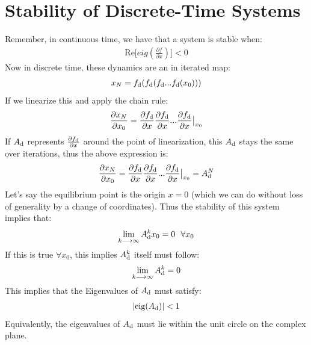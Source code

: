\section{Stability of Discrete-Time Systems}
Remember, in continuous time, we have that a system is stable when: 
\begin{align}
    \textrm{Re} \big[ eig ( \frac{\partial f}{\partial x} ) \big] < 0 
\end{align}
Now in discrete time, these dynamics are an in iterated map: 
\begin{align}
    x_{N} = f_{\rm d} ( f_{\rm d} ( f_{\rm d} ... f_{\rm d} (x_0)))
\end{align}
If we linearize this and apply the chain rule: 
\begin{align}
    \frac{\partial x_N}{\partial x_0} = \frac{\partial f_{\rm d}}{\partial x} \frac{\partial f_{\rm d}}{\partial x} ... \evalat{\frac{\partial f_{\rm d}}{\partial x}}{x_0}
\end{align}
If $A_{\rm d}$ represents $\frac{\partial f_{\rm d}}{\partial x}$ around the point of linearization, this $A_{\rm d}$ stays the same over iterations, thus the above expression is: 
\begin{align}
    \frac{\partial x_N}{\partial x_0} = \frac{\partial f_{\rm d}}{\partial x} \frac{\partial f_{\rm d}}{\partial x} ... \evalat{\frac{\partial f_{\rm d}}{\partial x}}{x_0} = A_{\rm d}^N
\end{align}
Let's say the equilibrium point is the origin $x=0$ (which we can do without loss of generality by a change of coordinates). Thus the stability of this system implies that:
\begin{align}
    \lim_{k \longrightarrow \infty} A_{\rm d}^k x_0 = 0 \ \ \forall x_0
\end{align}
If this is true $\forall x_0$, this implies $A_{\rm d}^k$ itself must follow: 
\begin{align}
    \lim_{k \longrightarrow \infty} A_{\rm d}^k = 0
\end{align}
This implies that the Eigenvalues of $A_{\rm d}$ must satisfy: 
\begin{align}
    | \textrm{eig} ( A_{\rm d})  | < 1 
\end{align}
Equivalently, the eigenvalues of $A_{\rm d}$ must lie within the unit circle on the complex plane.

